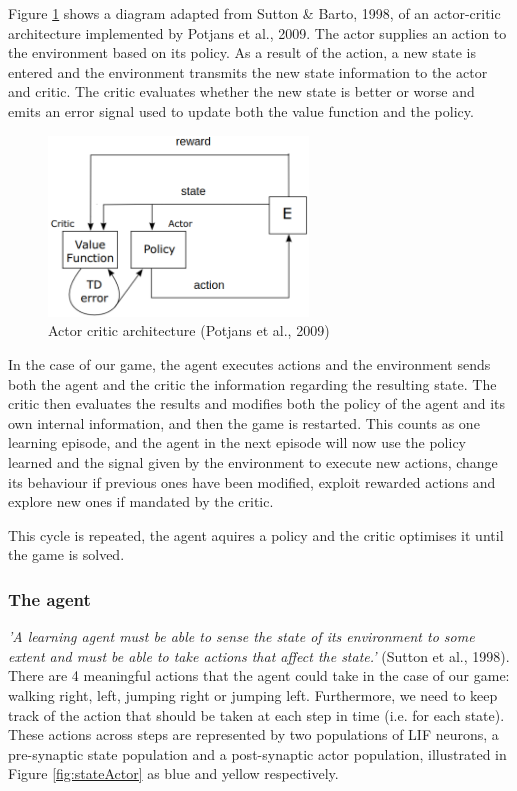 \documentclass[10pt]{article}
\begin{document}
    Figure \ref{fig:potjansArchitecture} shows a diagram adapted from Sutton \& Barto, 1998, of an actor-critic architecture implemented by Potjans et al., 2009. The actor supplies an action to the environment based on its policy. As a result of the action, a new state is entered and the environment transmits the new state information to the actor and critic. The critic evaluates whether the new state is better or worse and emits an error signal used to update both the value function and the policy.

    \begin{figure}[ht!]
    \centering
    \includegraphics[width=69mm]{./actorCriticDiagram.png}
    \caption{Actor critic architecture (Potjans et al., 2009)}
    \label{fig:potjansArchitecture}
    \end{figure}

    \setcounter{figure}{5}

    In the case of our game, the agent executes actions and the environment sends both the agent and the critic the information regarding the resulting state. The critic then evaluates the results and modifies both the policy of the agent and its own internal information, and then the game is restarted. This counts as one learning episode, and the agent in the next episode will now use the policy learned and the signal given by the environment to execute new actions, change its behaviour if previous ones have been modified, exploit rewarded actions and explore new ones if mandated by the critic. 
    
    This cycle is repeated, the agent aquires a policy and the critic optimises it until the game is solved.

    \subsubsection{The agent}

    \textit{'A learning agent must be able to sense the state of its environment to some extent and must be able to take actions that affect the state.'} (Sutton et al., 1998). There are 4 meaningful actions that the agent could take in the case of our game: walking right, left, jumping right or jumping left. Furthermore, we need to keep track of the action that should be taken at each step in time (i.e. for each state). These actions across steps are represented by two populations of LIF neurons, a pre-synaptic state population and a post-synaptic actor population, illustrated in Figure \ref{fig:stateActor} as blue and yellow respectively.
    
\end{document}
